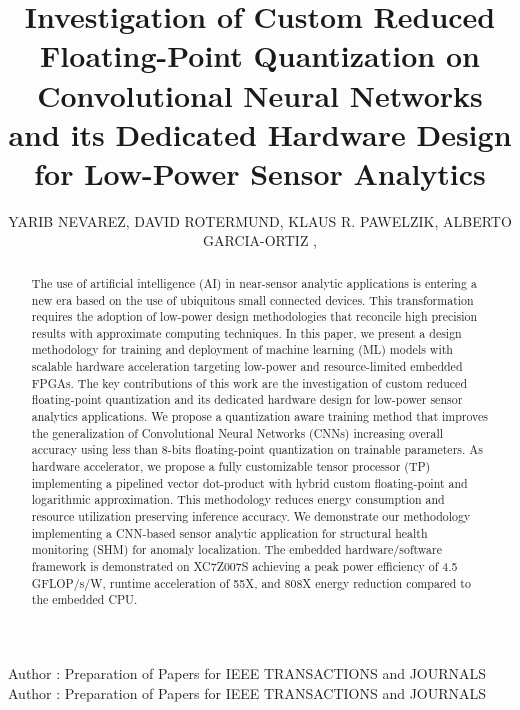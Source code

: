 \title {Investigation of Custom Reduced Floating-Point Quantization on Convolutional Neural Networks and its Dedicated Hardware Design for Low-Power Sensor Analytics}

\author{
	\uppercase{Yarib Nevarez},	
	\uppercase{David Rotermund},
	\uppercase{Klaus R. Pawelzik},
	\uppercase{Alberto Garcia-Ortiz} ,
}

\address[1]{Institute of Electrodynamics and Microelectronics, University of Bremen, Bremen 28359, Germany (e-mail: nevarez@item.uni-bremen.de)}

\address[2]{Institute for Theoretical Physics, University of Bremen, Bremen 28359, Germany (e-mail: davrot@neuro.uni-bremen.de)}

\address[3]{Institute for Theoretical Physics, University of Bremen, Bremen 28359, Germany (e-mail: pawelzik@neuro.uni-bremen.de)}

\address[4]{Institute of Electrodynamics and Microelectronics, University of Bremen, Bremen 28359, Germany (e-mail: agarcia@item.uni-bremen.de)}


\markboth
{Author \headeretal: Preparation of Papers for IEEE TRANSACTIONS and JOURNALS}
{Author \headeretal: Preparation of Papers for IEEE TRANSACTIONS and JOURNALS}


\begin{abstract}
The use of artificial intelligence (AI) in near-sensor analytic applications is entering a new era based on the use of ubiquitous small connected devices. This transformation requires the adoption of low-power design methodologies that reconcile high precision results with approximate computing techniques. In this paper, we present a design methodology for training and deployment of machine learning (ML) models with scalable hardware acceleration targeting low-power and resource-limited embedded FPGAs. The key contributions of this work are the investigation of custom reduced floating-point quantization and its dedicated hardware design for low-power sensor analytics applications. We propose a quantization aware training method that improves the generalization of Convolutional Neural Networks (CNNs) increasing overall accuracy using less than 8-bits floating-point quantization on trainable parameters. As hardware accelerator, we propose a fully customizable tensor processor (TP) implementing a pipelined vector dot-product with hybrid custom floating-point and logarithmic approximation. This methodology reduces energy consumption and resource utilization preserving inference accuracy. We demonstrate our methodology implementing a CNN-based sensor analytic application for structural health monitoring (SHM) for anomaly localization. The embedded hardware/software framework is demonstrated on XC7Z007S achieving a peak power efficiency of 4.5 GFLOP/s/W, runtime acceleration of 55X, and 808X energy reduction compared to the embedded CPU.
\end{abstract}

